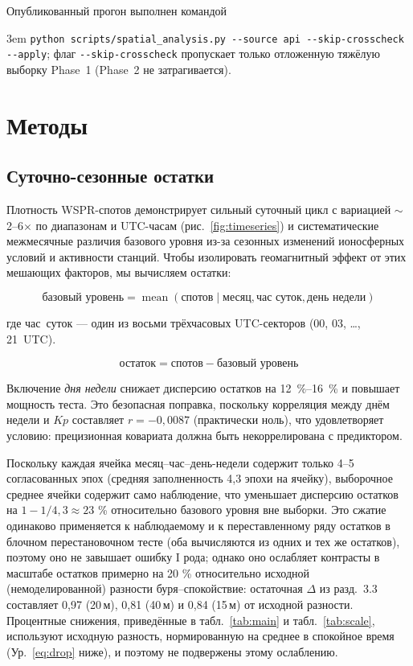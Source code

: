 \documentclass{agujournal2019}
\begin{document}
Опубликованный прогон выполнен командой
{\sloppy\emergencystretch 3em
\texttt{python scripts/spatial\_analysis.py -\kern0pt-source api -\kern0pt-skip-crosscheck -\kern0pt-apply};
флаг \verb|--skip-crosscheck| пропускает только отложенную тяжёлую
выборку Phase~1 (Phase~2 не затрагивается).
\par}

\section{Методы}

\subsection{Суточно-сезонные остатки}

Плотность WSPR-спотов демонстрирует сильный суточный цикл с вариацией
$\sim$2--6$\times$ по диапазонам и UTC-часам
(рис.~\ref{fig:timeseries}) и систематические межмесячные различия
базового уровня из-за сезонных изменений ионосферных условий и активности
станций. Чтобы изолировать геомагнитный эффект от этих мешающих факторов,
мы вычисляем остатки:

\begin{equation}
	\mbox{базовый уровень} = \operatorname{mean}(\mbox{спотов} \mid \mbox{месяц},
	\mbox{час суток}, \mbox{день недели})
	\label{eq:baseline}
\end{equation}

где \mbox{час суток} --- один из восьми трёхчасовых UTC-секторов
(00, 03, \ldots, 21~UTC).

\begin{equation}
	\mbox{остаток} = \mbox{спотов} - \mbox{базовый уровень}
	\label{eq:residual}
\end{equation}

Включение \emph{дня недели} снижает дисперсию остатков на
\SIrange{12}{16}{\percent} и повышает мощность теста. Это безопасная
поправка, поскольку корреляция между днём недели и $Kp$ составляет
$r = -0{,}0087$ (практически ноль), что удовлетворяет условию: прецизионная
ковариата должна быть некоррелирована с предиктором.

Поскольку каждая ячейка месяц--час--день-недели содержит только 4--5
согласованных эпох (средняя заполненность 4,3 эпохи на ячейку), выборочное
среднее ячейки содержит само наблюдение, что уменьшает дисперсию остатков
на $1 - 1/4{,}3 \approx 23$ \% относительно базового уровня вне выборки. Это
сжатие одинаково применяется к наблюдаемому и к переставленному ряду
остатков в блочном перестановочном тесте (оба вычисляются из одних и тех же
остатков), поэтому оно не завышает ошибку I рода; однако оно ослабляет
контрасты в масштабе остатков примерно на 20 \% относительно исходной
(немоделированной) разности буря--спокойствие: остаточная $\Delta$ из
разд.~3.3 составляет 0,97 (20\,м), 0,81 (40\,м) и 0,84 (15\,м) от исходной
разности. Процентные снижения, приведённые в табл.~\ref{tab:main} и
табл.~\ref{tab:scale}, используют исходную разность, нормированную на
среднее в спокойное время (Ур.~\eqref{eq:drop} ниже), и поэтому
не подвержены этому ослаблению.
\end{document}
